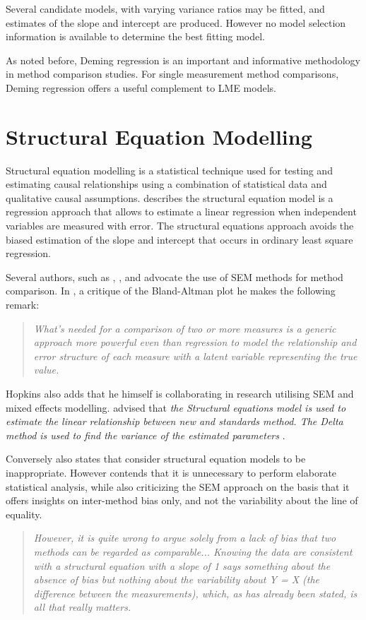 \documentclass[12pt, a4paper]{report}
\theoremstyle{plain}
\theoremstyle{definition}
\theoremstyle{remark}
\begin{document}
Several candidate models, with varying variance ratios may be fitted, and estimates of the slope and intercept are produced. However no model selection information is available to determine the best fitting model.

As noted before, Deming regression is an important and informative methodology in method comparison studies. For single measurement method comparisons, Deming regression offers a useful complement to LME models.



\section{Structural Equation Modelling}

Structural equation modelling is a statistical technique used for testing and estimating causal relationships using a combination of statistical data and qualitative causal assumptions. \citet{carrasco2004} describes the structural equation model is a regression approach that allows to estimate a linear 
regression when independent variables are measured with error.
The structural equations approach avoids the biased estimation of the slope and intercept that occurs in ordinary least square regression.

Several authors, such as \citet{lewis1991}, \citet{gkelly1985}, \citet{voelkel2005} and \citet{hopkins2004bias} advocate the use of SEM methods for method comparison. In \citet{hopkins2004bias}, a critique of the Bland-Altman plot he makes the following remark:

\begin{quote}
	\textit{What's needed for a comparison of two or more measures is a
		generic approach more powerful even than regression to model the
		relationship and error structure of each measure with a latent
		variable representing the true value.}
\end{quote}	

Hopkins also adds that he himself is collaborating in research utilising SEM and mixed effects modelling. \citet{gkelly1985} advised that \textit{the Structural equations model is used to estimate the linear relationship between new and standards method. The Delta method is used to find the variance of the estimated parameters} \citep{gkelly1985}.


Conversely \citet{BA99} also states that consider structural equation models to be inappropriate. However \citet{BA87} contends that it is unnecessary to perform elaborate statistical analysis, while also criticizing the SEM approach on the basis that it offers insights  on inter-method bias only, and not the variability about the line of equality. 
\begin{quote}
	\textit{However, it is quite wrong to argue solely from a lack of bias that two methods can be regarded as comparable...
		Knowing the data are consistent with a structural equation with a slope of 1 says something 
		about the absence of bias but nothing about the variability about Y = X (the difference between the measurements), which, as has already been stated, is all that really matters.}
\end{quote}
\end{document}
